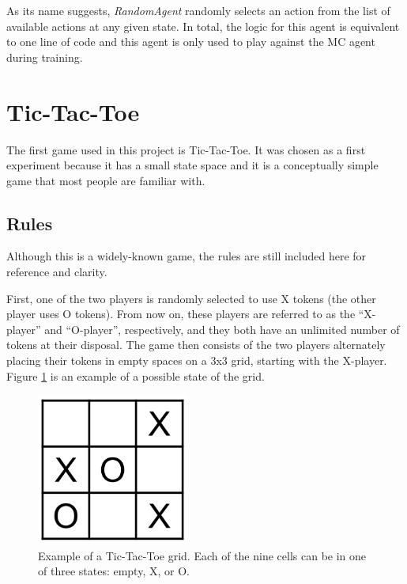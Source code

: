 \documentclass[11pt,a4paper]{report}
\begin{document}
As its name suggests, \emph{RandomAgent} randomly selects an action from the list of available actions at any given state. In total, the logic for this agent is equivalent to one line of code and this agent is only used to play against the MC agent during training.


\section{Tic-Tac-Toe}
\label{sec:TicTacToe}

The first game used in this project is Tic-Tac-Toe. It was chosen as a first experiment because it has a small state space and it is a conceptually simple game that most people are familiar with.


\subsection{Rules}

Although this is a widely-known game, the rules \cite{tic-tac-toe-rules} are still included here for reference and clarity.

First, one of the two players is randomly selected to use X tokens (the other player uses O tokens). From now on, these players are referred to as the ``X-player'' and ``O-player'', respectively, and they both have an unlimited number of tokens at their disposal. The game then consists of the two players alternately placing their tokens in empty spaces on a 3x3 grid, starting with the X-player. Figure \ref{tic-tac-toe-grid-example} is an example of a possible state of the grid.

\begin{figure}[htbp]
	\begin{center}
		\includegraphics[width=50mm]{tictactoe_grid_example.png}
		\caption{Example of a Tic-Tac-Toe grid. Each of the nine cells can be in one of three states: empty, X, or O.}
		\label{tic-tac-toe-grid-example}
	\end{center}
\end{figure}
\end{document}
